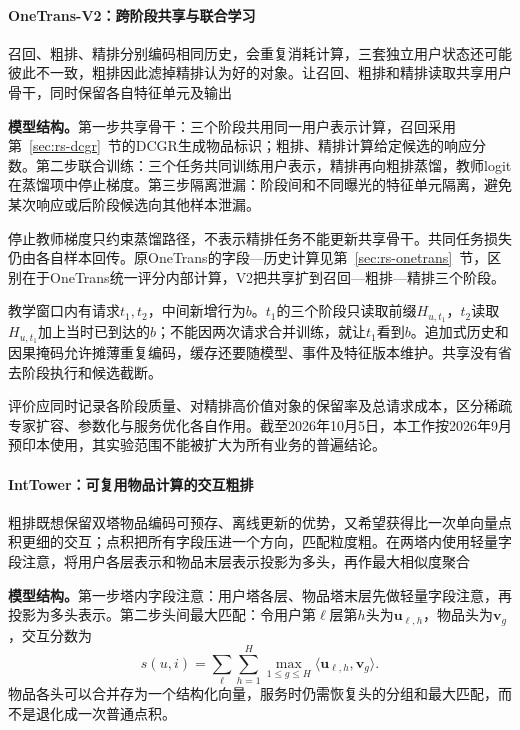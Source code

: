 \paragraph{OneTrans-V2：跨阶段共享与联合学习}
\label{sec:rs-onetrans-v2}

召回、粗排、精排分别编码相同历史，会重复消耗计算，三套独立用户状态还可能彼此不一致，粗排因此滤掉精排认为好的对象。让召回、粗排和精排读取共享用户骨干，同时保留各自特征单元及输出

\textbf{模型结构。}第一步共享骨干：三个阶段共用同一用户表示计算，召回采用第~\ref{sec:rs-dcgr}~节的DCGR生成物品标识；粗排、精排计算给定候选的响应分数。第二步联合训练：三个任务共同训练用户表示，精排再向粗排蒸馏，教师logit在蒸馏项中停止梯度。第三步隔离泄漏：阶段间和不同曝光的特征单元隔离，避免某次响应或后阶段候选向其他样本泄漏。

停止教师梯度只约束蒸馏路径，不表示精排任务不能更新共享骨干。共同任务损失仍由各自样本回传。原OneTrans的字段—历史计算见第~\ref{sec:rs-onetrans}~节，区别在于OneTrans统一评分内部计算，V2把共享扩到召回—粗排—精排三个阶段。

教学窗口内有请求$t_1,t_2$，中间新增行为$b$。$t_1$的三个阶段只读取前缀$H_{u,t_1}$，$t_2$读取$H_{u,t_1}$加上当时已到达的$b$；不能因两次请求合并训练，就让$t_1$看到$b$。追加式历史和因果掩码允许摊薄重复编码，缓存还要随模型、事件及特征版本维护。共享没有省去阶段执行和候选截断。

评价应同时记录各阶段质量、对精排高价值对象的保留率及总请求成本，区分稀疏专家扩容、参数化与服务优化各自作用。截至2026年10月5日，本工作按2026年9月预印本使用，其实验范围不能被扩大为所有业务的普遍结论。

\paragraph{IntTower：可复用物品计算的交互粗排}
\label{sec:rs-inttower}

粗排既想保留双塔物品编码可预存、离线更新的优势，又希望获得比一次单向量点积更细的交互；点积把所有字段压进一个方向，匹配粒度粗。在两塔内使用轻量字段注意，将用户各层表示和物品末层表示投影为多头，再作最大相似度聚合

\textbf{模型结构。}第一步塔内字段注意：用户塔各层、物品塔末层先做轻量字段注意，再投影为多头表示。第二步头间最大匹配：令用户第$\ell$层第$h$头为$\bm u_{\ell,h}$，物品头为$\bm v_g$，交互分数为
\begin{equation}
 s(u,i)=\sum_{\ell}\sum_{h=1}^{H}
           \max_{1\leq g\leq H}
               \langle\bm u_{\ell,h},\bm v_g\rangle.
 \label{eq:rs-inttower}
\end{equation}
物品各头可以合并存为一个结构化向量，服务时仍需恢复头的分组和最大匹配，而不是退化成一次普通点积。

